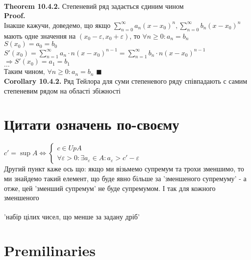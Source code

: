 \documentclass[a4paper, 14pt]{extarticle}
\def\huge{\displaystyle}
\def\bigline{\vspace{5mm}\\}
\def\th#1{\textbf{Theorem {#1}}}
\def\crl#1{\textbf{Corollary {#1}}}
\def\proof{\textbf{Proof.}\\}
\def\bigline{\vspace{5mm}\\}
\def\qed{$\blacksquare$}
\begin{document}
\bigline
\th{10.4.2.} Степеневий ряд задається єдиним чином\\
\proof
Інакше кажучи, доведемо, що якщо $\huge \sum_{n=0}^\infty a_n(x-x_0)^n, \sum_{n=0}^\infty b_n(x-x_0)^n$ мають одне значення на $(x_0-\varepsilon, x_0+\varepsilon)$, то $\forall n \geq 0: a_n = b_n$\\
$S(x_0) = a_0 = b_0$\\
$S'(x_0) = \huge \sum_{n=1}^\infty a_n \cdot n(x-x_0)^{n-1} = \sum_{n=1}^\infty b_n \cdot n(x-x_0)^{n-1}$\\
$\Rightarrow S'(x_0) = a_1 = b_1$\\
$\dots$\\
Таким чином, $\forall n \geq 0: a_n = b_n$ \qed
\bigline
\crl{10.4.2.} Ряд Тейлора для суми степеневого ряду співпадають с самим степеневим рядом на області збіжності

\newpage
\section*{Цитати означень по-своєму}
$c' = \sup A \iff \begin{cases} c \in UpA \\ \forall \varepsilon > 0: \exists a_{\varepsilon} \in A: a_{\varepsilon} > c' - \varepsilon \end{cases}$\\
Другий пункт каже ось що: якщо ми візьмемо супремум та трохи зменшимо, то ми знайдемо такий елемент, що буде явно більше за 'зменшеного супремуму' - а отже, цей 'зменший супремум' не буде супремумом. І так для кожного зменшеного\\
\\
'набір цілих чисел, що менше за задану дріб'

\newpage

\section{Premilinaries}


\newpage
\end{document}
